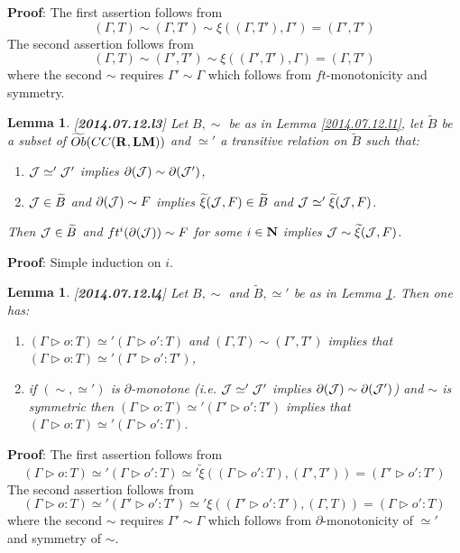 \documentclass[11pt]{article}
\newenvironment{proof}{{\bf Proof}:}{\vskip 5mm }
\newtheorem{lemma}[proposition]{Lemma}
\newcommand{\llabel}[1]{\label{#1}[{\bf #1}]}
\newcommand{\nn}{{\bf N\rm}}
\newcommand{\nat}{\nn}
\newcommand{\rr}{{\bf R}}
\newcommand{\lm}{{\bf LM}}
\newcommand{\wt}{\widetilde}
\begin{document}
%
\begin{proof}
The first assertion follows from
%
$$(\Gamma,T)\sim (\Gamma,T')\sim \xi((\Gamma,T'),\Gamma')=(\Gamma',T')$$
%
The second assertion  follows from
%
$$(\Gamma,T)\sim (\Gamma',T')\sim \xi((\Gamma',T'),\Gamma)=(\Gamma,T')$$
%
where the second $\sim$ requires $\Gamma'\sim \Gamma$ which follows from $ft$-monotonicity and symmetry.
\end{proof}
%
\begin{lemma}
\llabel{2014.07.12.l3}
Let $B,\sim$ be as in Lemma \ref{2014.07.12.l1}, let $\wt{B}$ be a subset of $\wt{Ob}(CC(\rr,\lm))$ and $\simeq'$ a transitive relation on $\wt{B}$ such that: 
%
\begin{enumerate}
\item ${\cal J}\simeq' {\cal J}'$ implies $\partial({\cal J})\sim\partial({\cal J}')$,
\item ${\cal J}\in \wt{B}$ and $\partial({\cal J})\sim F$ implies $\wt{\xi}({\cal J},F)\in \wt{B}$ and ${\cal J}\simeq' \wt{\xi}({\cal J},F)$.
\end{enumerate}
%
Then ${\cal J}\in \wt{B}$ and $ft^i(\partial({\cal J}))\sim F$ for some $i\in\nat$ implies ${\cal J}\sim \wt{\xi}({\cal J},F)$. 
\end{lemma}
%
\begin{proof}
Simple induction on $i$.
\end{proof}
%
\begin{lemma}
\llabel{2014.07.12.l4}
Let $B,\sim$ and $\wt{B},\simeq'$ be as in Lemma \ref{2014.07.12.l3}. Then one has:
%
\begin{enumerate}
\item $(\Gamma\rhd o:T)\simeq' (\Gamma\rhd o':T)$ and $(\Gamma,T)\sim (\Gamma',T')$ implies that $(\Gamma\rhd o:T)\simeq' (\Gamma'\rhd o':T')$,
\item if $(\sim,\simeq')$ is $\partial$-monotone (i.e. ${\cal J}\simeq' {\cal J}'$ implies $\partial({\cal J})\sim \partial({\cal J}')$) and $\sim$ is symmetric then $(\Gamma\rhd o:T)\simeq' (\Gamma'\rhd o':T')$ implies that $(\Gamma\rhd o:T)\simeq' (\Gamma\rhd o':T)$.
\end{enumerate}
\end{lemma}
%
\begin{proof}
The first assertion follows from
%
$$(\Gamma\rhd o:T)\simeq'  (\Gamma\rhd o':T)\simeq' \wt{\xi}((\Gamma\rhd o':T) ,(\Gamma',T'))=(\Gamma'\rhd o':T')$$
%
The second assertion follows from
%
$$(\Gamma\rhd o:T)\simeq' (\Gamma'\rhd o':T')\simeq' \xi((\Gamma'\rhd o':T'),(\Gamma,T))=(\Gamma\rhd o':T)$$
%
where the second $\sim$ requires $\Gamma'\sim \Gamma$ which follows from $\partial$-monotonicity of $\simeq'$ and symmetry of $\sim$.
\end{proof}
%
\end{document}
